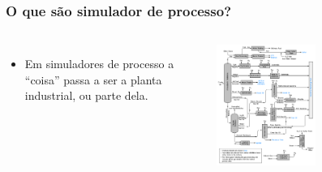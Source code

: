 \documentclass[aspectratio=169]{beamer}
\begin{document}
\begin{frame}
	\frametitle{O que são simulador de processo?}
	\begin{columns}[c] 
		\begin{itemize}
		  \item Em simuladores de processo a ``coisa'' passa a ser a planta industrial, ou
		parte dela.
		\end{itemize}
		\begin{center}
			\includegraphics[width=0.5\textwidth]
				{img/RefineryFlow.png}
		\end{center}
	\end{columns}
\end{frame}
\end{document}
